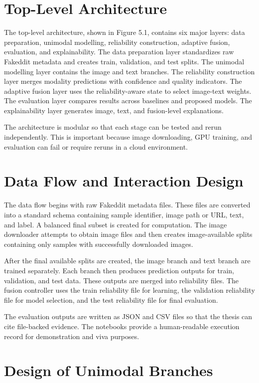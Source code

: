 \section{Top-Level Architecture}


The top-level architecture, shown in Figure 5.1, contains six major layers: data preparation, unimodal modelling, reliability construction, adaptive fusion, evaluation, and explainability. The data preparation layer standardizes raw Fakeddit metadata and creates train, validation, and test splits. The unimodal modelling layer contains the image and text branches. The reliability construction layer merges modality predictions with confidence and quality indicators. The adaptive fusion layer uses the reliability-aware state to select image-text weights. The evaluation layer compares results across baselines and proposed models. The explainability layer generates image, text, and fusion-level explanations.


The architecture is modular so that each stage can be tested and rerun independently. This is important because image downloading, GPU training, and evaluation can fail or require reruns in a cloud environment.


\section{Data Flow and Interaction Design}


The data flow begins with raw Fakeddit metadata files. These files are converted into a standard schema containing sample identifier, image path or URL, text, and label. A balanced final subset is created for computation. The image downloader attempts to obtain image files and then creates image-available splits containing only samples with successfully downloaded images.


After the final available splits are created, the image branch and text branch are trained separately. Each branch then produces prediction outputs for train, validation, and test data. These outputs are merged into reliability files. The fusion controller uses the train reliability file for learning, the validation reliability file for model selection, and the test reliability file for final evaluation.


The evaluation outputs are written as JSON and CSV files so that the thesis can cite file-backed evidence. The notebooks provide a human-readable execution record for demonstration and viva purposes.


\section{Design of Unimodal Branches}


